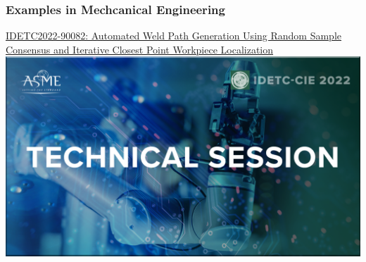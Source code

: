 \documentclass[fleqn]{beamer} %
\newcommand{\sectiontitleV}{Examples in Mechcanical Engineering}
\begin{document}
\begin{frame}[label=sectionV]
\frametitle{\sectiontitleV}
\href{https://events-platform.asmeconferences.org/event/idetc-cie-2022/planning/UGxhbm5pbmdfOTcxNDk4}{IDETC2022-90082: Automated Weld Path Generation Using Random Sample Consensus and Iterative Closest Point Workpiece Localization}\vspace{5mm}\\

\includegraphics[scale=0.125]{IDETC_technical_session.png}

\end{frame}
\end{document}
